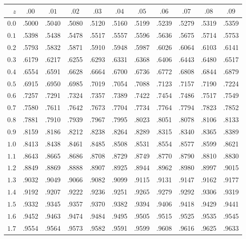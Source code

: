 \begin{center}
\small
\renewcommand{\arraystretch}{1.18}
\begin{tabular}{r|cccccccccc}
\hline
$z$ & $.00$ & $.01$ & $.02$ & $.03$ & $.04$ & $.05$ & $.06$ & $.07$ & $.08$ & $.09$ \\
\hline
$0.0$ & .5000 & .5040 & .5080 & .5120 & .5160 & .5199 & .5239 & .5279 & .5319 & .5359 \\
$0.1$ & .5398 & .5438 & .5478 & .5517 & .5557 & .5596 & .5636 & .5675 & .5714 & .5753 \\
$0.2$ & .5793 & .5832 & .5871 & .5910 & .5948 & .5987 & .6026 & .6064 & .6103 & .6141 \\
$0.3$ & .6179 & .6217 & .6255 & .6293 & .6331 & .6368 & .6406 & .6443 & .6480 & .6517 \\
$0.4$ & .6554 & .6591 & .6628 & .6664 & .6700 & .6736 & .6772 & .6808 & .6844 & .6879 \\
$0.5$ & .6915 & .6950 & .6985 & .7019 & .7054 & .7088 & .7123 & .7157 & .7190 & .7224 \\
$0.6$ & .7257 & .7291 & .7324 & .7357 & .7389 & .7422 & .7454 & .7486 & .7517 & .7549 \\
$0.7$ & .7580 & .7611 & .7642 & .7673 & .7704 & .7734 & .7764 & .7794 & .7823 & .7852 \\
$0.8$ & .7881 & .7910 & .7939 & .7967 & .7995 & .8023 & .8051 & .8078 & .8106 & .8133 \\
$0.9$ & .8159 & .8186 & .8212 & .8238 & .8264 & .8289 & .8315 & .8340 & .8365 & .8389 \\
\hline
$1.0$ & .8413 & .8438 & .8461 & .8485 & .8508 & .8531 & .8554 & .8577 & .8599 & .8621 \\
$1.1$ & .8643 & .8665 & .8686 & .8708 & .8729 & .8749 & .8770 & .8790 & .8810 & .8830 \\
$1.2$ & .8849 & .8869 & .8888 & .8907 & .8925 & .8944 & .8962 & .8980 & .8997 & .9015 \\
$1.3$ & .9032 & .9049 & .9066 & .9082 & .9099 & .9115 & .9131 & .9147 & .9162 & .9177 \\
$1.4$ & .9192 & .9207 & .9222 & .9236 & .9251 & .9265 & .9279 & .9292 & .9306 & .9319 \\
$1.5$ & .9332 & .9345 & .9357 & .9370 & .9382 & .9394 & .9406 & .9418 & .9429 & .9441 \\
$1.6$ & .9452 & .9463 & .9474 & .9484 & .9495 & .9505 & .9515 & .9525 & .9535 & .9545 \\
$1.7$ & .9554 & .9564 & .9573 & .9582 & .9591 & .9599 & .9608 & .9616 & .9625 & .9633 \\

\end{tabular}
\end{center}
